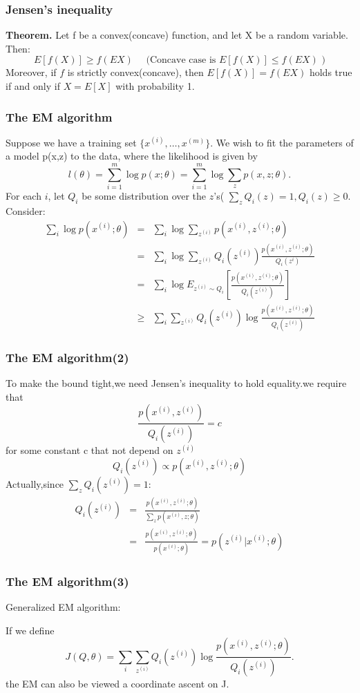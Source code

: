 \documentclass[slidestop,compress,mathserif]{beamer}
\begin{document}
	\begin{frame}
		\frametitle{Jensen’s inequality}
		\textbf{Theorem.} Let f be a convex(concave) function, and let X be
		a random variable. Then:
		$$E[f(X)]\ge f(EX)\quad\mbox{ (Concave case is $E[f(X)]\le f(EX)$ )}$$
		Moreover, if $f$ is strictly convex(concave), then $E[f(X)]=f(EX)$ 
		holds true if and only if $X=E[X]$ with probability 1.
		\begin{figure}
        \end{figure}
	\end{frame}
	\begin{frame}[shrink]
		\frametitle{The EM algorithm}
		Suppose we have a training set $\{x^{(i)},\ldots,x^{(m)}\}$.
		We wish to fit the parameters of a model p(x,z) to the data,
		where the likelihood is given by
		$$l(\theta)=\sum_{i=1}^m\log p(x;\theta)=\sum_{i=1}^m
		\log\sum_zp(x,z;\theta).$$
		For each $i$, let $Q_i$ be some distribution over the $z$'s(
		$\sum_zQ_i(z)=1, Q_i(z)\ge 0$. Consider:
		\begin{eqnarray}
			\sum_i\log p(x^{(i)};\theta) &=& \sum_i\log\sum_{z^{(i)}}
			p(x^{(i)},z^{(i)};\theta)\\
			&=& \sum_i\log\sum_{z^{(i)}}Q_i(z^{(i)})\frac{p(x^{(i)},
			z^{(i)};\theta)}{Q_i(z^{i})}\\
			&=& \sum_i\log E_{z^{(i)}\sim Q_i}[\frac{p(x^{(i)},
			z^{(i)};\theta)}{Q_i(z^{(i)})}]\\
			&\ge& \sum_i\sum_{z^{(i)}}Q_i(z^{(i)})\log\frac{p(x^{(i)},
			z^{(i)};\theta)}{Q_i(z^{(i)})}
		\end{eqnarray}
	\end{frame}
	\begin{frame}[shrink]
		\frametitle{The EM algorithm(2)}
		To make the bound tight,we need Jensen's inequality to hold
		equality.we require that
		$$\frac{p(x^{(i)},z^{(i)})}{Q_i(z^{(i)})}=c$$
		for some constant c that not depend on $z^{(i)}$
		$$Q_i(z^{(i)})\propto p(x^{(i)},z^{(i)};\theta)$$
		Actually,since $\sum_zQ_i(z^{(i)})=1$:
		\begin{eqnarray*}
			Q_i(z^{(i)}) &=& \frac{p(x^{(i)},z^{(i)};\theta)}{
			\sum_zp(x^{(i)},z;\theta)}\\
			&=& \frac{p(x^{(i)},z^{(i)};\theta)}{p(x^{(i)};\theta)}=
			p(z^{(i)}|x^{(i)};\theta)
		\end{eqnarray*}
	\end{frame}	
	\begin{frame}[shrink]
		\frametitle{The EM algorithm(3)}
		Generalized EM algorithm:
		\begin{figure}
        \end{figure}
        If we define
        $$J(Q,\theta)=\sum_i\sum_{z^{(i)}}Q_i(z^{(i)})\log\frac{
        p(x^{(i)},z^{(i)};\theta)}{Q_i(z^{(i)})}.$$
        the EM can also be viewed a coordinate ascent on J.
        $$$$
	\end{frame}
\end{document}
